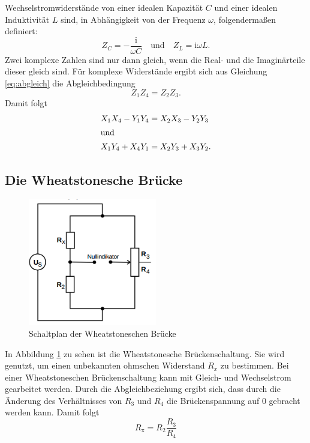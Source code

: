 \documentclass[
  bibliography=totoc,     %
  captions=tableheading,  %
  titlepage=firstiscover, %
]{scrartcl}
\begin{document}
Wechselstromwiderstände von einer idealen Kapazität $C$ und einer idealen
Induktivität $L$ sind, in Abhängigkeit von der Frequenz $\omega$, folgendermaßen
definiert:
\begin{equation}
    Z_C = -\frac{\mathup{i}}{\omega C} \quad \mathup{und} \quad Z_L = \mathup{i} \omega L.
    \label{eq:impedanzen}
\end{equation}
Zwei komplexe Zahlen sind nur dann gleich, wenn die Real- und die Imaginärteile
dieser gleich sind. Für komplexe Widerstände ergibt sich aus Gleichung
\ref{eq:abgleich} die Abgleichbedingung
\begin{equation}
    \label{eq:abgleich_komplex}
    Z_1 Z_4 = Z_2 Z_3.
\end{equation}
Damit folgt
\begin{align}
    \label{eq:abgleich_komplex_1}
    X_1 X_4 - Y_1 Y_4 &= X_2 X_3 - Y_2 Y_3 \\
    \shortintertext{und}
    \label{eq:abgleich_komplex_2}
    X_1 Y_4 + X_4 Y_1 &= X_2 Y_3 + X_3 Y_2.
\end{align}
\newpage
\subsection{Die Wheatstonesche Brücke}
\begin{figure}[htb]
  \centering
  \includegraphics[width=0.5\textwidth]{V3022.png}
  \caption{Schaltplan der Wheatstoneschen Brücke}
  \label{fig:V3022}
\end{figure}
In Abbildung \ref{fig:V3022} zu sehen ist die Wheatstonesche Brückenschaltung.
Sie wird genutzt, um einen unbekannten ohmschen Widerstand $R_x$ zu bestimmen.
Bei einer Wheatstoneschen Brückenschaltung kann mit Gleich- und
Wechselstrom gearbeitet werden. Durch die Abgleichbeziehung ergibt sich,
dass durch die Änderung des Verhältnisses von $R_3$ und $R_4$ die
Brückenspannung auf 0 gebracht werden kann. Damit folgt
\begin{equation}
    \label{eq:wheatstone}
    R_{\mathup{x}} = R_2 \frac{R_3}{R_4}
\end{equation}
\newpage
\end{document}
